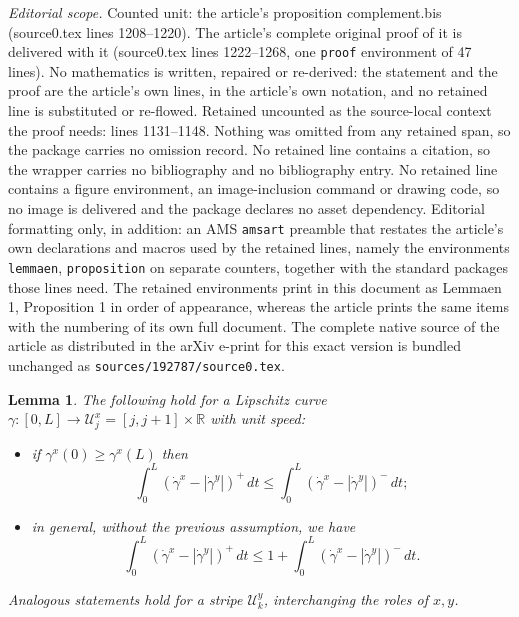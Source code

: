 \documentclass[10pt,a4paper]{amsart}
\newtheorem{lemmaen}{Lemma}
\newcommand{\R}{\mathbb{R}}
\newcommand{\str}{\mathcal{U}}
\begin{document}
\noindent\textit{Editorial scope.} Counted unit: the article's proposition complement.bis (source0.tex lines 1208--1220). The article's complete original proof of it is delivered with it (source0.tex lines 1222--1268, one \texttt{proof} environment of 47 lines). No mathematics is written, repaired or re-derived: the statement and the proof are the article's own lines, in the article's own notation, and no retained line is substituted or re-flowed.  Retained uncounted as the source-local context the proof needs: lines 1131--1148.  Nothing was omitted from any retained span, so the package carries no omission record.  No retained line contains a citation, so the wrapper carries no bibliography and no bibliography entry.  No retained line contains a figure environment, an image-inclusion command or drawing code, so no image is delivered and the package declares no asset dependency.  Editorial formatting only, in addition: an AMS \texttt{amsart} preamble that restates the article's own declarations and macros used by the retained lines, namely the environments \texttt{lemmaen}, \texttt{proposition} on separate counters, together with the standard packages those lines need.  The retained environments print in this document as Lemmaen 1, Proposition 1 in order of appearance, whereas the article prints the same items with the numbering of its own full document.  The complete native source of the article as distributed in the arXiv e-print for this exact version is bundled unchanged as \texttt{sources/192787/source0.tex}.
\begin{lemmaen}\label{lemma.curve}
The following hold
for a Lipschitz curve $\gamma:[0,L]\to\str_j^x=[j,j+1]\times\R$ with unit speed:
\begin{itemize}
\item[(i)] if %
$\gamma^x(0)\ge\gamma^x(L)$
then
$$\int_0^L(\dot\gamma^x-|\dot\gamma^y|)^+\,dt
\le \int_0^L(\dot\gamma^x-|\dot\gamma^y|)^-\,dt;$$
\item[(ii)] %
in general, without the previous assumption, we have
$$\int_0^L(\dot\gamma^x-|\dot\gamma^y|)^+\,dt
\le 1+\int_0^L(\dot\gamma^x-|\dot\gamma^y|)^-\,dt.$$
\end{itemize}
Analogous statements hold for a stripe $\str_k^y$, interchanging the roles of $x,y$.
\end{lemmaen}
\end{document}
